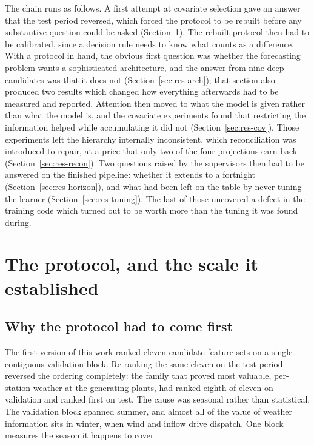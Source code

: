 The chain runs as follows. A first attempt at covariate selection gave an answer that the
test period reversed, which forced the protocol to be rebuilt before any substantive
question could be asked (Section~\ref{sec:res-protocol}). The rebuilt protocol then had to
be calibrated, since a decision rule needs to know what counts as a difference. With a
protocol in hand, the obvious first question was whether the forecasting problem wants a
sophisticated architecture, and the answer from nine deep candidates was that it does not
(Section~\ref{sec:res-arch}); that section also produced two results which changed how
everything afterwards had to be measured and reported. Attention then moved to what the
model is given rather than what the model is, and the covariate experiments found that
restricting the information helped while accumulating it did not
(Section~\ref{sec:res-cov}). Those experiments left the hierarchy internally inconsistent,
which reconciliation was introduced to repair, at a price that only two of the four
projections earn back (Section~\ref{sec:res-recon}). Two questions raised by the
supervisors then had to be answered on the finished pipeline: whether it extends to a
fortnight (Section~\ref{sec:res-horizon}), and what had been left on the table by never
tuning the learner (Section~\ref{sec:res-tuning}). The last of those uncovered a defect in
the training code which turned out to be worth more than the tuning it was found during.

\section{The protocol, and the scale it established}
\label{sec:res-protocol}

\subsection{Why the protocol had to come first}

The first version of this work ranked eleven candidate feature sets on a single contiguous
validation block. Re-ranking the same eleven on the test period reversed the ordering
completely: the family that proved most valuable, per-station weather at the generating
plants, had ranked eighth of eleven on validation and ranked first on test. The cause was
seasonal rather than statistical. The validation block spanned summer, and almost all of
the value of weather information sits in winter, when wind and inflow drive dispatch. One
block measures the season it happens to cover.

